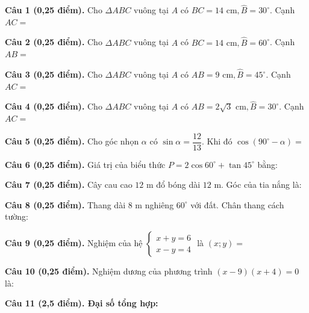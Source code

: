 \documentclass[12pt,a4paper]{article}
\begin{document}
\vspace{1.2mm}
\noindent\textbf{Câu 1 (0,25 điểm).} Cho $\Delta ABC$ vuông tại $A$ có $BC = 14\text{ cm}, \widehat{B} = 30^\circ$. Cạnh $AC =$ \par\vspace{0.6mm}
\noindent\textbf{Câu 2 (0,25 điểm).} Cho $\Delta ABC$ vuông tại $A$ có $BC = 14\text{ cm}, \widehat{B} = 60^\circ$. Cạnh $AB =$ \par\vspace{0.6mm}
\noindent\textbf{Câu 3 (0,25 điểm).} Cho $\Delta ABC$ vuông tại $A$ có $AB = 9\text{ cm}, \widehat{B} = 45^\circ$. Cạnh $AC =$ \par\vspace{0.6mm}
\noindent\textbf{Câu 4 (0,25 điểm).} Cho $\Delta ABC$ vuông tại $A$ có $AB = 2\sqrt{3}\text{ cm}, \widehat{B} = 30^\circ$. Cạnh $AC =$ \par\vspace{0.6mm}
\noindent\textbf{Câu 5 (0,25 điểm).} Cho góc nhọn $\alpha$ có $\sin \alpha = \dfrac{12}{13}$. Khi đó $\cos(90^\circ - \alpha) =$ \par\vspace{0.6mm}
\noindent\textbf{Câu 6 (0,25 điểm).} Giá trị của biểu thức $P = 2\cos 60^\circ + \tan 45^\circ$ bằng: \par\vspace{0.6mm}
\noindent\textbf{Câu 7 (0,25 điểm).} Cây cau cao $12\text{ m}$ đổ bóng dài $12\text{ m}$. Góc của tia nắng là: \par\vspace{0.6mm}
\noindent\textbf{Câu 8 (0,25 điểm).} Thang dài $8\text{ m}$ nghiêng $60^\circ$ với đất. Chân thang cách tường: \par\vspace{0.6mm}
\noindent\textbf{Câu 9 (0,25 điểm).} Nghiệm của hệ $\begin{cases} x + y = 6 \\ x - y = 4 \end{cases}$ là $(x; y) =$ \par\vspace{0.6mm}
\noindent\textbf{Câu 10 (0,25 điểm).} Nghiệm dương của phương trình $(x - 9)(x + 4) = 0$ là: \par\vspace{0.6mm}
\vspace{0.8mm}
\noindent\textbf{Câu 11 (2,5 điểm). Đại số tổng hợp:}
\vspace{0.6mm}
\end{document}
